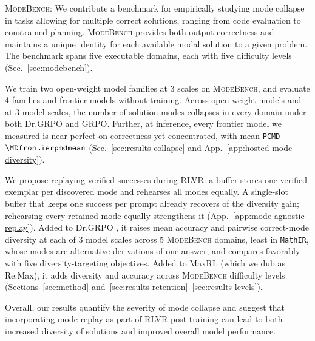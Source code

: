 \documentclass{article}
\newcommand{\1}{\mathbf 1}
\newcommand{\mb}{\textsc{ModeBench}}
\newcommand{\pmd}{\texttt{PCMD}}
\theoremstyle{remark}
\theoremstyle{definition}
\theoremstyle{plain}
\begin{document}
\begingroup
\setlength{\leftmargini}{1.1em}
\begin{compactenum}
    \item \mb{}: We contribute a benchmark for empirically studying mode collapse in tasks allowing for multiple correct solutions, ranging from code evaluation to constrained planning. \mb{} provides both output correctness and maintains a unique identity for each available modal solution to a given problem. The benchmark spans five executable domains, each with five difficulty levels (Sec.~\ref{sec:modebench}).

    \item We train two open-weight model families at 3 scales on \mb{}, and evaluate 4 families and \MDfrontierdeployments{} frontier models without training.
    Across open-weight models and at 3 model scales, the number of solution modes collapses in every domain under both Dr.GRPO and GRPO.
    Further, at inference, every frontier model we measured is near-perfect on correctness yet concentrated, with mean \pmd{} $\MDfrontierpmdmean$ (Sec.~\ref{sec:results-collapse} and App.~\ref{app:hosted-mode-diversity}).

    \item We propose replaying verified successes during RLVR: a buffer stores one verified exemplar per discovered mode and rehearses all modes equally. A single-slot buffer that keeps one success per prompt already recovers \MARrecovered{} of the diversity gain; rehearsing every retained mode equally strengthens it (App.~\ref{app:mode-agnostic-replay}). Added to Dr.GRPO \citep{liu2025understanding}, it raises mean accuracy and pairwise correct-mode diversity at each of 3 model scales across 5 \mb{} domains, least in \texttt{MathIR}, whose modes are alternative derivations of one answer, and compares favorably with five diversity-targeting objectives. Added to MaxRL \citep{tajwar2026maxrl} (which we dub as Re:Max), it adds diversity and accuracy across \mb{} difficulty levels (Sections~\ref{sec:method} and~\ref{sec:results-retention}--\ref{sec:results-levels}).

\end{compactenum}
\endgroup

Overall, our results quantify the severity of mode collapse and suggest that incorporating mode replay as part of RLVR post-training can lead to both increased diversity of solutions and improved overall model performance.
\end{document}
